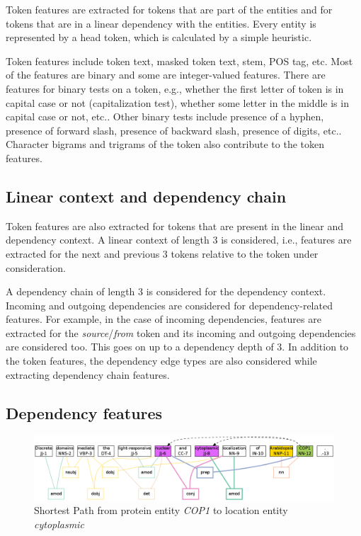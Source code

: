 Token features are extracted for tokens that are part of the entities and for tokens that are in a linear dependency with the entities. Every entity is represented by a head token, which is calculated by a simple heuristic. %

Token features include token text, masked token text, stem, POS tag, etc. Most of the features are binary and some are integer-valued features. There are features for binary tests on a token, e.g., whether the first letter of token is in capital case or not (capitalization test), whether some letter in the middle is in capital case or not, etc.. Other binary tests include presence of a hyphen, presence of forward slash, presence of backward slash, presence of digits, etc.. Character bigrams and trigrams of the token also contribute to the token features.

\subsection*{Linear context and dependency chain}

Token features are also extracted for tokens that are present in the linear and dependency context. A linear context of length 3 is considered, i.e., features are extracted for the next and previous 3 tokens relative to the token under consideration.

A dependency chain of length 3 is considered for the dependency context. Incoming and outgoing dependencies are considered for dependency-related features. For example, in the case of incoming dependencies, features are extracted for the \emph{source}/\emph{from} token and its incoming and outgoing dependencies are considered too. This goes on up to a dependency depth of 3. In addition to the token features, the dependency edge types are also considered while extracting dependency chain features.

\subsection*{Dependency features}

\begin{figure}
\centering
\includegraphics[scale=0.3]{figures/ShortestPath.png}
\caption{Shortest Path from protein entity \textit{COP1} to location entity \textit{cytoplasmic}}\label{fig:shortPath}
\end{figure}


